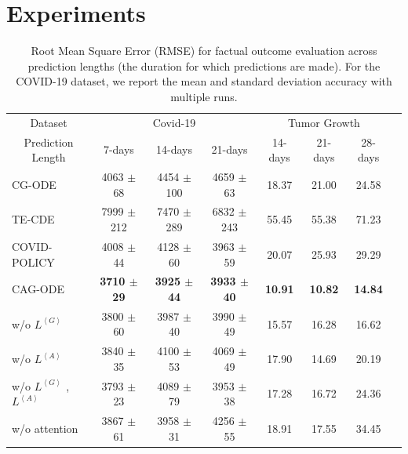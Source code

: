 \section{Experiments}
\begin{table}[]
\centering
\caption{Root Mean Square Error (RMSE) for factual outcome evaluation across prediction lengths (the duration for which predictions are made). For the COVID-19 dataset, we report the mean and standard deviation accuracy with multiple runs.}
 \vspace{-1em}
\begin{tabular}{l|ccc|cccc}
\toprule
\multicolumn{1}{c|}{Dataset}           & \multicolumn{3}{c|}{Covid-19}                   & \multicolumn{3}{c}{Tumor Growth}                   \\
\multicolumn{1}{c|}{Prediction Length} & 7-days & 14-days & 21-days & 14-days & 21-days & 28-days \\ \hline
CG-ODE                                 & 4063 $\pm$ 68     & 4454 $\pm$ 100    & 4659 $\pm$ 63           & 18.37          & 21.00          & 24.58          \\
TE-CDE                                 & 7999 $\pm$ 212    & 7470 $\pm$ 289    & 6832 $\pm$ 243           & 55.45          & 55.38          & 71.23          \\
COVID-POLICY                           & 4008 $\pm$ 44      & 4128 $\pm$ 60     & 3963 $\pm$ 59  & 20.07          & 25.93         &  29.29         \\ \hline
CAG-ODE                                & \textbf{3710 $\pm$ 29}     & \textbf{3925 $\pm$ 44}     & \textbf{3933 $\pm$ 40}           & \textbf{10.91} & \textbf{10.82} & \textbf{14.84}          \\
w/o $L^{\left< G \right>}$             & 3800 $\pm$ 60     & 3987 $\pm$ 40     & 3990 $\pm$ 49           & 15.57          & 16.28          & 16.62              \\
w/o $L^{\left< A \right>}$             & 3840 $\pm$ 35     & 4100 $\pm$ 53     & 4069 $\pm$ 49           & 17.90          & 14.69          & 20.19              \\
w/o $L^{\left< G \right>}$ ,$L^{\left< A \right>}$                       & 3793 $\pm$ 23     & 4089 $\pm$ 79     & 3953 $\pm$ 38           & 17.28          & 16.72          & 24.36          \\
w/o attention                          & 3867 $\pm$ 61     & 3958 $\pm$ 31      & 4256 $\pm$ 55           & 18.91          & 17.55          & 34.45          \\ %
\bottomrule
\end{tabular}%
\medskip
\label{exp:main_table}
\vspace{-2em}
\end{table}
